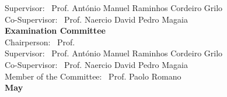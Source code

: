 \begin{titlepage}
\begin{center}
{\large Supervisor: \ Prof. António Manuel Raminhos Cordeiro Grilo}\\
{\large Co-Supervisor: \ Prof. Naercio David Pedro Magaia}\\[2cm]
{\Large \textbf{Examination Committee}}\\[1cm]
{\large Chairperson: \ Prof. }\\
{\large Supervisor: \ Prof. António Manuel Raminhos Cordeiro Grilo}\\
{\large Co-Supervisor: \ Prof. Naercio David Pedro Magaia}\\
{\large Member of the Committee: \ Prof. Paolo Romano}\\[2cm]


{\Large \textbf{May}}\\
\end{center}
\end{titlepage}